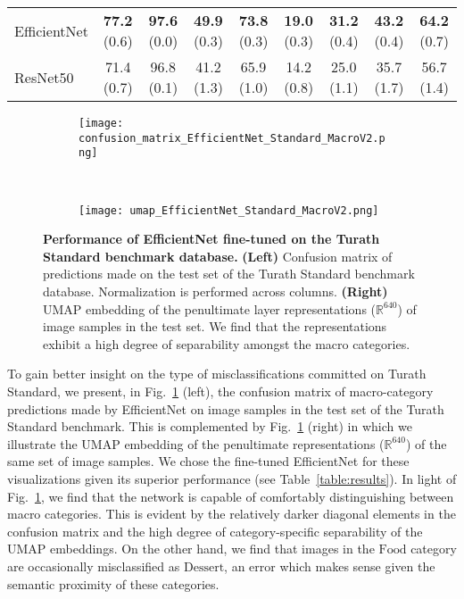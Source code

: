 \documentclass{article}
\begin{document}
\begin{table}[!t]
{\begin{tabular}{l c c c c c c c c}
         EfficientNet & \textbf{77.2} {\scriptsize(0.6)} & \textbf{97.6} {\scriptsize(0.0)}  & \textbf{49.9} {\scriptsize(0.3)} & \textbf{73.8} {\scriptsize(0.3)} & \textbf{19.0} {\scriptsize(0.3)} & \textbf{31.2} {\scriptsize(0.4)} & \textbf{43.2} {\scriptsize(0.4)} & \textbf{64.2} {\scriptsize(0.7)} \\
         ResNet50 & 71.4 {\scriptsize(0.7)} & 96.8 {\scriptsize(0.1)}  & 41.2 {\scriptsize(1.3)} & 65.9 {\scriptsize(1.0)} & 14.2 {\scriptsize(0.8)} & 25.0 {\scriptsize(1.1)} & 35.7 {\scriptsize(1.7)} & 56.7 {\scriptsize(1.4)}\\         
         \bottomrule
    \end{tabular}
    }
\end{table}

\begin{figure}[!b]
    \centering
    \begin{subfigure}{0.45\textwidth}
    \texttt{[image: confusion\_matrix\_EfficientNet\_Standard\_MacroV2.png]}
    \end{subfigure}
    ~
    \begin{subfigure}{0.40\textwidth}
    \texttt{[image: umap\_EfficientNet\_Standard\_MacroV2.png]}
    \end{subfigure}
    \caption{\textbf{Performance of EfficientNet fine-tuned on the Turath Standard benchmark database.} \textbf{(Left)} Confusion matrix of predictions made on the test set of the Turath Standard benchmark database. Normalization is performed across columns. \textbf{(Right)} UMAP embedding of the penultimate layer representations ($\mathbb{R}^{640}$) of image samples in the test set. We find that the representations exhibit a high degree of separability amongst the macro categories.}
    \label{fig:standard_confusion_matrix}
\end{figure}

To gain better insight on the type of misclassifications committed on Turath Standard, we present, in Fig.~\ref{fig:standard_confusion_matrix} (left), the confusion matrix of macro-category predictions made by EfficientNet on image samples in the test set of the Turath Standard benchmark. This is complemented by Fig.~\ref{fig:standard_confusion_matrix} (right) in which we illustrate the UMAP embedding of the penultimate representations ($\mathbb{R}^{640}$) of the same set of image samples. We chose the fine-tuned EfficientNet for these visualizations given its superior performance (see Table~\ref{table:results}). In light of Fig.~\ref{fig:standard_confusion_matrix}, we find that the network is capable of comfortably distinguishing between macro categories. This is evident by the relatively darker diagonal elements in the confusion matrix and the high degree of category-specific separability of the UMAP embeddings. On the other hand, we find that images in the $\mathrm{Food}$ category are occasionally misclassified as $\mathrm{Dessert}$, an error which makes sense given the semantic proximity of these categories.
\end{document}
